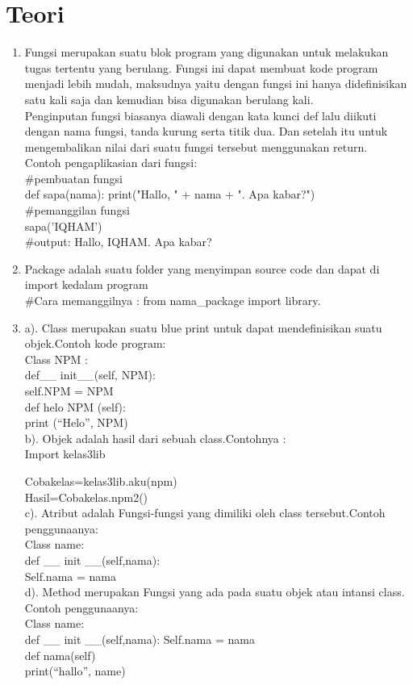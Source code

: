 \chapter*{Teori}

\begin{enumerate}
	\item Fungsi merupakan suatu blok program yang digunakan untuk melakukan tugas tertentu yang berulang. Fungsi ini dapat membuat kode program menjadi lebih mudah, maksudnya yaitu dengan fungsi ini hanya didefinisikan satu kali saja dan kemudian bisa  digunakan berulang kali.\\
    Penginputan fungsi biasanya diawali dengan kata kunci def lalu diikuti dengan nama fungsi, tanda kurung serta titik dua. Dan setelah itu untuk mengembalikan nilai dari suatu fungsi tersebut menggunakan return.\\
	Contoh pengaplikasian dari fungsi:\\
	\#pembuatan fungsi\\
	  def sapa(nama):  
        print("Hallo, " + nama + ". Apa kabar?")\\
	 \#pemanggilan fungsi \\ 
	    sapa('IQHAM')\\
	  \#output: Hallo, IQHAM. Apa kabar? \\
	
	\item Package adalah suatu folder yang menyimpan source code dan dapat di import kedalam program\\
	\#Cara memanggilnya : from nama\_package import library.
	
	\item a). Class merupakan suatu blue print  untuk  dapat mendefinisikan suatu objek.Contoh kode program: \\
	Class NPM :\\
	def\_\_ init\_\_(self, NPM):\\
		self.NPM = NPM\\
	def  helo NPM (self):\\
		print (“Helo”, NPM)\\
	b). Objek adalah hasil dari sebuah class.Contohnya :\\
	Import kelas3lib
	
	Cobakelas=kelas3lib.aku(npm)\\
 	Hasil=Cobakelas.npm2()\\
	c).	Atribut adalah  Fungsi-fungsi yang dimiliki oleh class tersebut.Contoh penggunaanya:\\
	Class name:\\
	def \_\_ init \_\_(self,nama):\\
	Self.nama = nama\\
	d). Method merupakan Fungsi yang ada pada suatu objek atau intansi class. Contoh penggunaanya:\\
	Class name:\\
	def \_\_ init \_\_(self,nama):
	Self.nama = nama\\
	def nama(self)\\
	print(“hallo”, name)\\
	

\end{enumerate}
